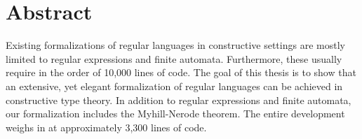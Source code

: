 \chapter*{Abstract}
\label{chap:abstract}
Existing formalizations of regular languages in constructive settings are mostly limited to regular expressions and finite automata. 
Furthermore, these usually require in the order of 10,000 lines of code. %
The goal of this thesis is to show that an extensive, yet elegant formalization of regular languages can be achieved in constructive type theory. 
In addition to regular expressions and finite automata, our formalization includes the Myhill-Nerode theorem. 
The entire development weighs in at approximately 3,300 lines of code. %
